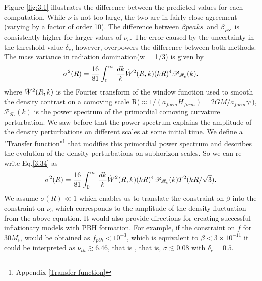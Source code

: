 Figure \ref{fig:3.1} illustrates the difference between the predicted values for each computation. While $\nu$ is not too large, the two are in fairly close agreement (varying by a factor of order 10). The difference between $\beta {peaks}$ and $\beta_{PS}$ is consistently higher for larger values of $\nu_c$. The error caused by the uncertainty in the threshold value $\delta_c$, however, overpowers the difference between both methods.\\
The mass variance in radiation domination(w = 1/3) is given by
\begin{align}
    \sigma^{2}(R) = \frac{16}{81} \int_{0}^{\infty} \,\frac{dk}{k}  \Tilde{W}^{2}(R,k) (kR)^4\mathcal{P}_{\mathcal{R}_{c}}(k).  \label{3.34}
\end{align}
where $ \Tilde{W}^{2}(R,k)$ is the Fourier transform of the window function used to smooth the density contrast on a comoving scale R($\approx 1/(a_{form} H_{form}) = 2GM/a_{form} \gamma^{_1}$),$\mathcal{P}_{\mathcal{R}_{c}}(k)$ is the power spectrum of the primordial comoving curvature perturbation. We saw before that the power spectrum explains the amplitude of the density perturbations on different scales at some initial time. We define a "Transfer function"\footnote{Appendix \ref{Transfer function}} that modifies this primordial power spectrum and describes the evolution of the density perturbations on subhorizon scales.  So we can re-write Eq.\ref{3.34} as
\begin{align}
    \sigma^{2}(R) = \frac{16}{81} \int_{0}^{\infty} \,\frac{dk}{k}  \Tilde{W}^{2}(R,k) (kR)^4\mathcal{P}_{\mathcal{R}_{c}}(k) T^{2}(kR/\sqrt{3}).  \label{3.35}
\end{align}
We assume $\sigma(R) \ll 1$ which enables us to translate the constraint on $\beta$ into the constraint on $\nu_{c}$ which corresponds to the amplitude of the density fluctuation from the above equation. It would also provide directions for creating successful inflationary models with PBH formation. For example, if the constraint on $f$ for $30 M_\odot$ would be obtained as $f_{pbh} < 10^{-3}$, which is equivalent to $\beta < 3 \times 10^{-11}$ it could be interpreted as $\nu_{th} \gtrsim 6.46$, that is , that is, $\sigma \lesssim 0.08$ with $\delta_{c} = 0.5 $.
